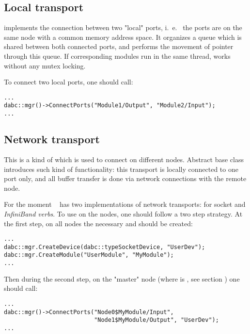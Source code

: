 \subsection{Local transport}

 implements
the connection between two "local" ports,
i.~e.~ the ports are on the same node with a common memory address space.
It organizes a queue which is shared between both connected ports,
and performs the movement of  pointer through this queue.
If corresponding modules run in the same thread, 
 works without any mutex locking.

To connect two local ports, one should call:
\begin{small}
\begin{verbatim}
...
dabc::mgr()->ConnectPorts("Module1/Output", "Module2/Input");
...
\end{verbatim}     
\end{small}


\subsection{Network transport}

This is a kind of  which is used to 
connect  on different nodes.
Abstract base class  introduces such kind of 
functionality: this transport is locally connected  to one port only, 
and all buffer transfer is done
via network connections with the remote node. 

For the moment \dabc~ has two implementations of network transports: 
for socket and {\em InfiniBand verbs}.
To use  on the nodes, one should follow a two step strategy. 
At the first step, on all nodes the necessary  and  
should be created:
\begin{small}
\begin{verbatim}
...
dabc::mgr.CreateDevice(dabc::typeSocketDevice, "UserDev");
dabc::mgr.CreateModule("UserModule", "MyModule");
...
\end{verbatim}     
\end{small}

Then during the second step, on the "master" node 
(where  is , 
see section )
one should call:
\begin{small}
\begin{verbatim}
...
dabc::mgr()->ConnectPorts("Node0$MyModule/Input", 
                          "Node1$MyModule/Output", "UserDev");
...
\end{verbatim}     
\end{small}
 
